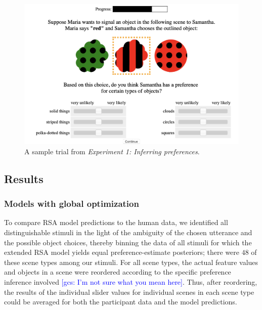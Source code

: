 \documentclass[10pt,a4paper]{article}
\newcommand{\gcs}[1]{\textcolor{blue}{[gcs: #1]}}
\begin{document}
\begin{figure}[ht!]
	\centering
	\includegraphics[width=4.5in]{images/preference-trial.png}
	\caption{A sample trial from \emph{Experiment 1: Inferring preferences}.}\label{exp1-trial}
\end{figure}

\subsection{Results}



\subsubsection{Models with global optimization}

To compare RSA model predictions to the human data, we identified all distinguishable stimuli in the light of the ambiguity of the chosen utterance and the possible object choices, thereby binning the data of all stimuli for which the extended RSA model yields equal preference-estimate posteriors; there were $48$ of these scene types among our stimuli.
For all scene types, the actual feature values and objects in a scene were reordered according to the specific preference inference involved \gcs{I'm not sure what you mean here}. 
Thus, after reordering, the results of the individual slider values for individual scenes in each scene type could be averaged for both the participant data and the model predictions. 
\end{document}
